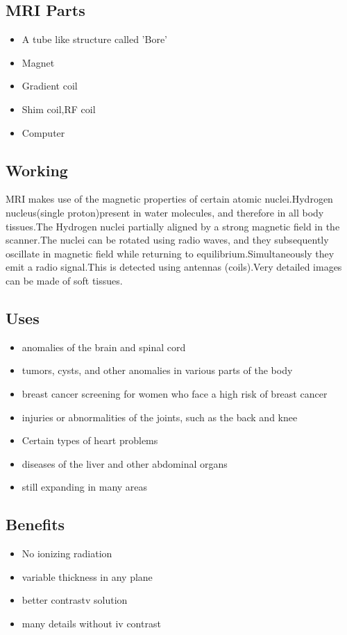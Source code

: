 \documentclass[12pt]{article}
\begin{document}
\subsection{MRI Parts}
\begin{itemize}
\item A tube like structure called 'Bore'
\item Magnet
\item Gradient coil
\item Shim coil,RF coil
\item Computer
\end{itemize}
\subsection{Working}
MRI makes use of the magnetic properties of certain atomic nuclei.Hydrogen nucleus(single proton)present in water molecules, and therefore in all body tissues.The Hydrogen  nuclei partially aligned by a strong magnetic field in the scanner.The nuclei can be rotated using radio waves, and they subsequently oscillate in magnetic field while returning to equilibrium.Simultaneously they emit a radio signal.This is detected using antennas (coils).Very detailed images can be made of soft tissues.

\subsection{Uses}
\begin{itemize}
\item anomalies of the brain and spinal cord
\item tumors, cysts, and other anomalies in various parts of the body
\item breast cancer screening for women who face a high risk of breast cancer
\item injuries or abnormalities of the joints, such as the back and knee
\item Certain types of heart problems
\item diseases of the liver and other abdominal organs
\item still expanding in many areas
\end{itemize}
\subsection{Benefits}
\begin{itemize}
\item No ionizing radiation
\item variable thickness in any plane
\item better contrastv solution
\item many details without iv contrast

\end{itemize}
\end{document}
